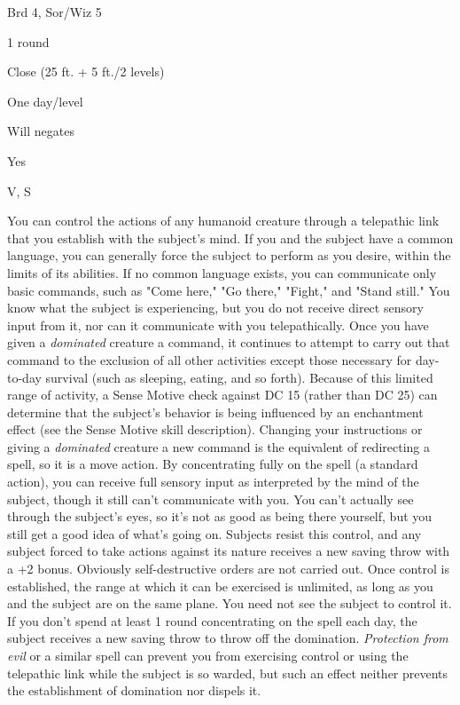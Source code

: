 
\begin{description*}
\item[Level:] Brd 4, Sor/Wiz 5
\item[Casting Time:] 1 round
\item[Range:] Close (25 ft. + 5 ft./2 levels)
\item[Duration:] One day/level
\item[Saving Throw:] Will negates
\item[Spell Resistance:] Yes
\item[Components:] V, S
\end{description*}

You can control the actions of any humanoid creature through a telepathic link
that you establish with the subject's mind.
If you and the subject have a common language, you can generally force the subject
to perform as you desire, within the limits of its abilities. If no common language
exists, you can communicate only basic commands, such as "Come here," "Go there,"
"Fight," and "Stand still." You know what the subject is experiencing, but
you do not receive direct sensory input from it, nor can it communicate with you
telepathically.
Once you have given a \textit{dominated} creature a command, it continues to attempt
to carry out that command to the exclusion of all other activities except those
necessary for day-to-day survival (such as sleeping, eating, and so forth). Because
of this limited range of activity, a Sense Motive check against DC 15 (rather than
DC 25) can determine that the subject's behavior is being influenced by an enchantment
effect (see the Sense Motive skill description).
Changing your instructions or giving a \textit{dominated} creature a new command
is the equivalent of redirecting a spell, so it is a move action.
By concentrating fully on the spell (a standard action), you can receive full sensory
input as interpreted by the mind of the subject, though it still can't communicate
with you. You can't actually see through the subject's eyes, so it's not as good
as being there yourself, but you still get a good idea of what's going on.
Subjects resist this control, and any subject forced to take actions against its
nature receives a new saving throw with a +2 bonus. Obviously self-destructive
orders are not carried out. Once control is established, the range at which it
can be exercised is unlimited, as long as you and the subject are on the same plane.
You need not see the subject to control it.
If you don't spend at least 1 round concentrating on the spell each day, the subject
receives a new saving throw to throw off the domination.
\textit{Protection from evil} or a similar spell can prevent you from exercising
control or using the telepathic link while the subject is so warded, but such an
effect neither prevents the establishment of domination nor dispels it.